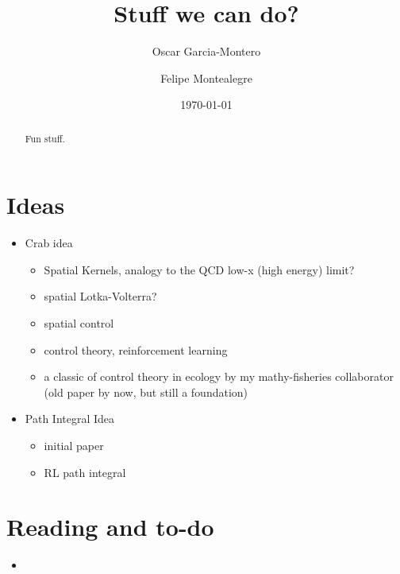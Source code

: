 \documentclass[aps,prd,twocolumn,notitlepage,nofootinbib,,nobibnotes,superscriptaddress,amsmath,amssymb,preprintnumbers]{revtex4-1}
\begin{document}
\date{\today}

\title{Stuff we can do?}

\author{Oscar Garcia-Montero}

\author{Felipe Montealegre}

         
\begin{abstract} 
Fun stuff.
\end{abstract}

\maketitle
\section{Ideas}
\label{sec:ideas}

\begin{itemize}
\item Crab idea 
\begin{itemize}
\item Spatial Kernels, analogy to the QCD low-x (high energy) limit?\cite{Mantysaari2013}
\item spatial Lotka-Volterra?
\cite{WU20194890} 
\item spatial control \cite{BONNEAU201615}
\item control theory, reinforcement learning \cite{lapeyrolerie2022deep,shastri2008optimal,bonneau2017optimal,bonneau2016spatially,montealegre2023pretty}
\item a classic of control theory in ecology by my mathy-fisheries collaborator (old paper by now, but still a foundation) \cite{walters1978ecological}
\end{itemize}

\item Path Integral Idea 
\begin{itemize}
\item initial paper \cite{Kappen_2005}
\item RL path integral \cite{theodorou2010generalized}
\end{itemize}

\end{itemize}
\section{Reading and to-do}
\label{sec:todo}

\begin{itemize}
\item 
\end{itemize}


\appendix 


\end{document}

